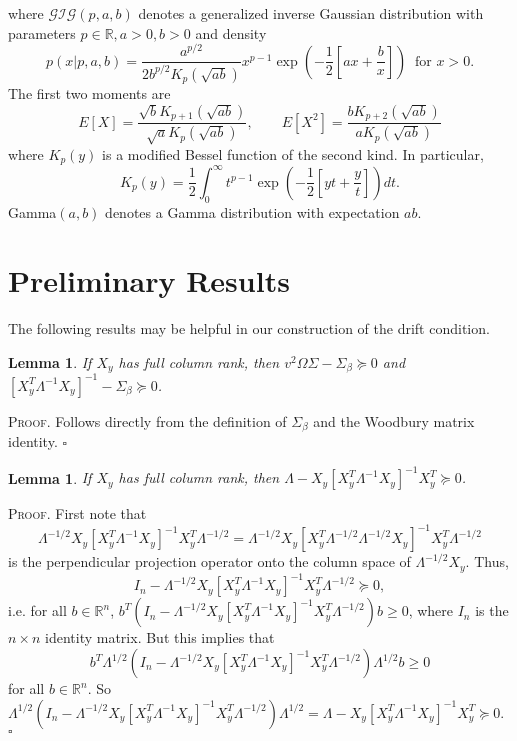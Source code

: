 \documentclass[12pt]{article}
\newtheorem{lemma}[theorem]{Lemma}
\newcounter{ProofCounter}
\newenvironment{Proof}{\stepcounter{ProofCounter}\textsc{Proof.}}{\hfill$\square$}
\numberwithin{equation}{section}
\begin{document}
where $\mathcal{GIG}(p, a, b)$ denotes a generalized inverse Gaussian distribution with parameters $p \in \mathbb{R}, a > 0, b > 0$ and density
\[
  p(x|p, a, b) = \frac{a^{p/2}}{2b^{p/2}K_{p}(\sqrt{ab})}x^{p - 1}\exp\left( -\frac{1}{2}\left[ ax + \frac{b}{x} \right] \right) \ \text{ for } x > 0.
\]
The first two moments are
\[
  E[X] = \frac{\sqrt{b}K_{p+1}(\sqrt{ab})}{\sqrt{a}K_{p}(\sqrt{ab})}, \qquad E[X^2] = \frac{bK_{p+2}(\sqrt{ab})}{aK_{p}(\sqrt{ab})}
\]
where $K_{p}(y)$ is a modified Bessel function of the second kind. In particular, 
\begin{equation}
  K_p(y) = \frac{1}{2} \int_{0}^{\infty} t^{p-1}\exp\left( -\frac{1}{2}\left[yt + \frac{y}{t}\right] \right) dt.
  \label{eq1}
\end{equation}
Gamma$(a,b)$ denotes a Gamma distribution with expectation $ab$.


\section{Preliminary Results}

The following results may be helpful in our construction of the drift condition. \\

\begin{lemma}
  If $X_{y}$ has full column rank, then $v^2 \Omega \Sigma - \Sigma_{\beta} \succeq 0$ and $[X_{y}^T \Lambda^{-1}X_{y}]^{-1} - \Sigma_{\beta} \succeq 0$.
  \label{l1}
\end{lemma}
\begin{Proof}
  Follows directly from the definition of $\Sigma_{\beta}$ and the Woodbury matrix identity.
\end{Proof} \\

\begin{lemma}
  If $X_{y}$ has full column rank, then $\Lambda - X_{y}[X_{y}^T \Lambda^{-1} X_{y}]^{-1} X_{y}^T \succeq 0$.
  \label{l2}
\end{lemma}
\begin{Proof}
  First note that 
  \[
    \Lambda^{-1/2}X_{y}[X_{y}^T \Lambda^{-1} X_{y}]^{-1} X_{y}^T \Lambda^{-1/2} = \Lambda^{-1/2}X_{y}[X_{y}^T \Lambda^{-1/2}\Lambda^{-1/2} X_{y}]^{-1} X_{y}^T \Lambda^{-1/2}
  \]
  is the perpendicular projection operator onto the column space of $\Lambda^{-1/2}X_{y}$. Thus, 
  \[
    I_n - \Lambda^{-1/2}X_{y}[X_{y}^T \Lambda^{-1} X_{y}]^{-1} X_{y}^T \Lambda^{-1/2}  \succeq 0,
  \]
  i.e. for all $b \in \mathbb{R}^{n}$, $b^T(I_n - \Lambda^{-1/2}X_{y}[X_{y}^T \Lambda^{-1} X_{y}]^{-1} X_{y}^T \Lambda^{-1/2})b \geq 0$,
  where $I_n$ is the $n\times n$ identity matrix. But this implies that 
  \[
    b^{T}\Lambda^{1/2} (I_n - \Lambda^{-1/2}X_{y}[X_{y}^T \Lambda^{-1} X_{y}]^{-1} X_{y}^T \Lambda^{-1/2}) \Lambda^{1/2}b \geq 0
  \]
  for all $b \in \mathbb{R}^{n}$. So
  $\Lambda^{1/2}(I_n - \Lambda^{-1/2}X_{y}[X_{y}^T \Lambda^{-1} X_{y}]^{-1} X_{y}^T \Lambda^{-1/2})\Lambda^{1/2} = \Lambda - X_{y}[X_{y}^T \Lambda^{-1} X_{y}]^{-1}X_{y}^T \succeq 0$.
\end{Proof} \\
\end{document}
